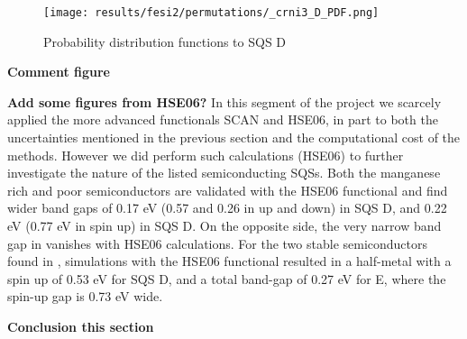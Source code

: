 \begin{figure}[H]
	\centering
	\texttt{[image: results/fesi2/permutations/\_crni3\_D\_PDF.png]}
	\caption{Probability distribution functions to  SQS D}
\end{figure}

\textbf{Comment figure \\}

\textbf{Add some figures from HSE06?}
In this segment of the project we scarcely applied the more advanced functionals SCAN and HSE06, in part to both the uncertainties mentioned in the previous section and the computational cost of the methods. However we did perform such calculations (HSE06) to further investigate the nature of the listed semiconducting SQSs. Both the manganese rich and poor semiconductors are validated with the HSE06 functional and find wider band gaps of 0.17 eV (0.57 and 0.26 in up and down) in  SQS D, and 0.22 eV (0.77 eV in spin up) in  SQS D. On the opposite side, the very narrow band gap in  vanishes with HSE06 calculations. For the two stable semiconductors found in , simulations with the HSE06 functional resulted in a half-metal with a spin up of 0.53 eV for SQS D, and a total band-gap of 0.27 eV for E, where the spin-up gap is 0.73 eV wide.

\textbf{Conclusion this section}
